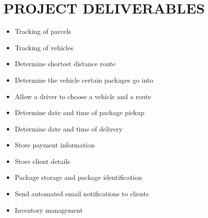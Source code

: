 \documentclass[paper=a4, fontsize=11pt]{scrartcl} %
\numberwithin{equation}{section} %
\numberwithin{figure}{section} %
\numberwithin{table}{section} %
\begin{document}
\section{PROJECT DELIVERABLES}


\begin{itemize}
\item Tracking of parcels
\item Tracking of vehicles
\item Determine shortest distance route
\item Determine the vehicle certain packages go into
\item Allow a driver to choose a vehicle and a route
\item Determine date and time of package pickup
\item Determine date and time of delivery
\item Store payment information
\item Store client details
\item Package storage and package identification
\item Send automated email notifications to clients
\item Inventory management
\end{itemize}
\end{document}

